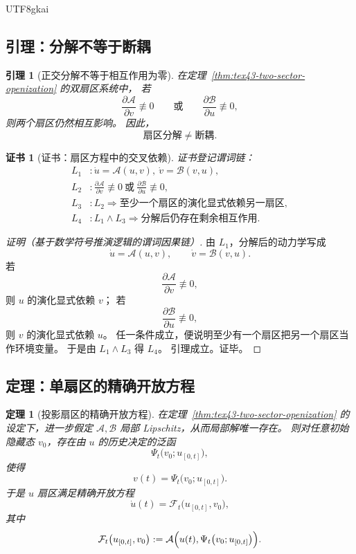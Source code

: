 \documentclass[12pt]{article}
\newtheorem{theorem}{定理}[section]
\newtheorem{lemma}{引理}[section]
\newtheorem{Certificate}{证书}[section]
\begin{document}
\begin{CJK*}{UTF8}{gkai}
\subsection{引理：分解不等于断耦}
\label{subsec:tex43-ch3-lemma}

\begin{lemma}[正交分解不等于相互作用为零]
\label{lem:tex43-split-not-decouple}
在定理~\ref{thm:tex43-two-sector-openization} 的双扇区系统中，
若
\[
  \frac{\partial \mathcal A}{\partial v}\not\equiv 0
  \qquad\text{或}\qquad
  \frac{\partial \mathcal B}{\partial u}\not\equiv 0,
\]
则两个扇区仍然相互影响。
因此，
\[
  \text{扇区分解}\neq \text{断耦}.
\]
\end{lemma}

\begin{Certificate}[证书：扇区方程中的交叉依赖]
\label{cert:tex43-split-not-decouple}
证书登记谓词链：
\[
\begin{aligned}
  L_1 &: \dot u=\mathcal A(u,v),\ \dot v=\mathcal B(v,u),\\
  L_2 &: \frac{\partial \mathcal A}{\partial v}\not\equiv 0\ \text{或}\ \frac{\partial \mathcal B}{\partial u}\not\equiv
    0,\\
  L_3 &: L_2 \Rightarrow \text{至少一个扇区的演化显式依赖另一扇区},\\
  L_4 &: L_1\wedge L_3 \Rightarrow \text{分解后仍存在剩余相互作用}.
\end{aligned}
\]
\end{Certificate}

\begin{proof}[证明（基于数学符号推演逻辑的谓词因果链）]
由 $L_1$，分解后的动力学写成
\[
  \dot u=\mathcal A(u,v),
  \qquad
  \dot v=\mathcal B(v,u).
\]
若
\[
  \frac{\partial \mathcal A}{\partial v}\not\equiv 0,
\]
则 $u$ 的演化显式依赖 $v$；
若
\[
  \frac{\partial \mathcal B}{\partial u}\not\equiv 0,
\]
则 $v$ 的演化显式依赖 $u$。
任一条件成立，便说明至少有一个扇区把另一个扇区当作环境变量。
于是由 $L_1\wedge L_3$ 得 $L_4$。
引理成立。证毕。
\end{proof}

\subsection{定理：单扇区的精确开放方程}
\label{subsec:tex43-ch3-theorem-open-equation}

\begin{theorem}[投影扇区的精确开放方程]
\label{thm:tex43-exact-open-equation}
在定理~\ref{thm:tex43-two-sector-openization} 的设定下，进一步假定 $\mathcal A,\mathcal B$ 局部 Lipschitz，从而局部解唯一存在。
则对任意初始隐藏态 $v_0$，存在由 $u$ 的历史决定的泛函
\[
  \Psi_t\bigl(v_0;u_{[0,t]}\bigr),
\]
使得
\[
  v(t)=\Psi_t\bigl(v_0;u_{[0,t]}\bigr).
\]
于是 $u$ 扇区满足精确开放方程
\[
  \dot u(t)
  =
  \mathcal F_t\bigl(u_{[0,t]},v_0\bigr),
\]
其中
\[
  \mathcal F_t\bigl(u_{[0,t]},v_0\bigr)
  :=
  \mathcal A\Bigl(u(t),\Psi_t\bigl(v_0;u_{[0,t]}\bigr)\Bigr).
\]
\end{theorem}


\end{CJK*}
\end{document}
